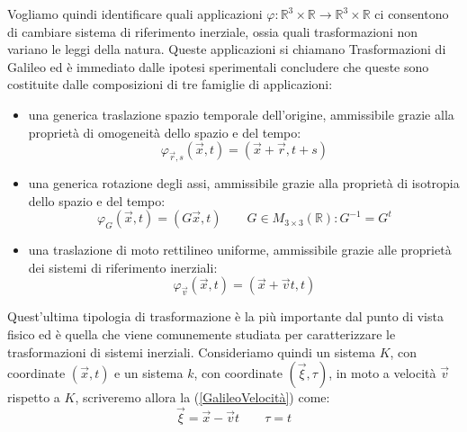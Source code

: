 Vogliamo quindi identificare quali applicazioni $\varphi:\mathbb{R}^3\times\mathbb{R}\rightarrow\mathbb{R}^3\times\mathbb{R}$ ci consentono di cambiare sistema di riferimento inerziale, ossia quali trasformazioni non variano le leggi della natura. Queste applicazioni si chiamano Trasformazioni di Galileo ed è immediato dalle ipotesi sperimentali concludere che queste sono costituite dalle composizioni di tre famiglie di applicazioni:
\begin{itemize}
	\item una generica traslazione spazio temporale dell'origine, ammissibile grazie alla proprietà di omogeneità dello spazio e del tempo:
	\begin{equation}
		\varphi_{\vec{r},s}(\vec{x},t)=(\vec{x}+\vec{r},t+s)
		\label{GalileoTraslazoine}
	\end{equation} 
\item una generica rotazione degli assi, ammissibile grazie alla proprietà di isotropia dello spazio e del tempo:
\begin{equation}
	\varphi_{G}(\vec{x},t)=(G\vec{x},t) \qquad G\in M_{3\times3}(\mathbb{R}):G^{-1}=G^t
	\label{GalileoRotazione}
\end{equation} 
	\item una traslazione di moto rettilineo uniforme, ammissibile grazie alle proprietà dei sistemi di riferimento inerziali:
\begin{equation}
	\varphi_{\vec{v}}(\vec{x},t)=(\vec{x}+\vec{v}t,t)
	\label{GalileoVelocità}
\end{equation} 
\end{itemize}
Quest'ultima tipologia di trasformazione è la più importante dal punto di vista fisico ed è quella che viene comunemente studiata per caratterizzare le trasformazioni di sistemi inerziali. Consideriamo quindi un sistema $K$, con coordinate $(\vec{x},t)$ e un sistema $k$, con coordinate $(\vec{\xi},\tau)$, in moto a velocità $\vec{v}$ rispetto a $K$, scriveremo allora la (\ref{GalileoVelocità}) come:
\begin{equation}
	\vec\xi=\vec{x}-\vec{v}t \qquad \tau=t
	\label{GalileoEasy}
\end{equation}

